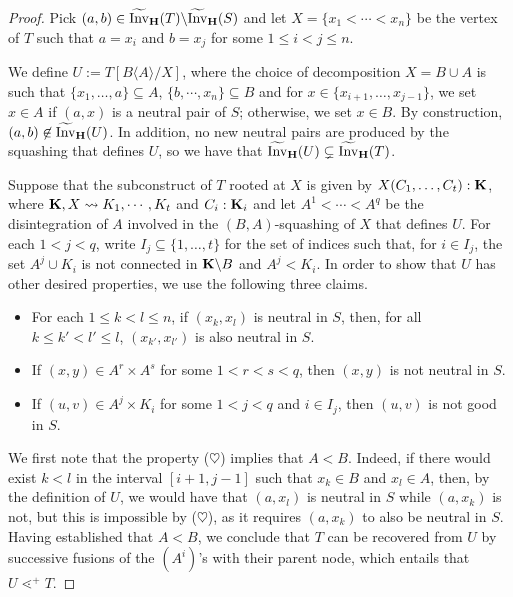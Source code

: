 \documentclass{article}
\theoremstyle{plain}
\theoremstyle{definition}
\newcommand{\Invt}{\widetilde{\mathrm{Inv}}}
\begin{document}
\begin{proof}
 Pick $(a,b)\in \Invt_{\bf H}(T)\backslash \Invt_{\bf H}(S)$ and let $X=\{x_1<\cdots <x_n\}$ be the vertex of $T$ such that $a=x_i$ and $b=x_j$ for some $1\leq i<j\leq n$. 

 

We define $U:=T[B\langle A\rangle /X]$, 
 where the choice of decomposition $X=B\cup A$ is such that $\{x_1,\dots,a\}\subseteq A$, $\{b,\cdots,x_n\}\subseteq B$ and for $x\in \{x_{i+1},\dots,x_{j-1}\}$, we set $x\in A$ if $(a,x)$ is a neutral pair of $S$; otherwise, we set $x\in B$. By construction, $(a,b)\not\in \Invt_{\bf H}(U)$. In addition, no new neutral pairs are produced by the squashing that defines $U$, so we have that $\Invt_{\bf H}(U)\subsetneq \Invt_{\bf H}(T)$. 

\smallskip

Suppose that the subconstruct of $T$ rooted at $X$ is given by $X(C_1,\dots,C_t):{\bf K}$, where ${\bf K},X\leadsto K_1,\cdots ,K_t$ and $C_i:{\bf K}_i$ and let $A^1<\cdots <A^q$ be the disintegration of $A$ involved in the $(B,A)$-squashing of $X$ that defines $U$. For each $1<j<q$, write $I_j\subseteq \{1,\dots,t\}$ for the set of indices such that, for $i\in I_j$, the set $A^j\cup K_i$ is not connected in ${\bf K}\backslash B$ and $A^j<K_i$. In order to show that $U$ has other desired properties, we use the following three claims.
\begin{itemize}
\item[($\heartsuit$)] For each $1\leq k<l\leq n$, if $(x_k,x_l)$ is neutral in $S$, then, for all $k\leq k' < l' \leq l$, $(x_{k'},x_{l'})$ is also neutral in $S$.
\item[($\clubsuit$)] If $(x,y)\in A^r\times A^s$ for some $1<r<s<q$, then $(x,y)$ is not neutral in $S$.
\item[($\spadesuit$)] If $(u,v)\in A^j\times K_i$ for some $1<j<q$ and $i\in I_j$, then $(u,v)$ is not good in $S$.
\end{itemize}
 
We first note that the property ($\heartsuit$) implies that $A<B$. Indeed, if there would exist $k<l$ in the interval $[i+1,j-1]$ such that $x_k\in B$ and $x_l\in A$, then, by the definition of $U$, we would have that $(a,x_l)$ is neutral in $S$ while $(a,x_k)$ is not, but this is impossible by ($\heartsuit$), as it requires $(a,x_k)$ to also be neutral in $S$. Having established that $A<B$, we conclude that $T$ can be recovered from $U$ by successive fusions of the $(A^i)$'s with their parent node, which entails that $U\lessdot^{+} T$.


\end{proof}
\end{document}
